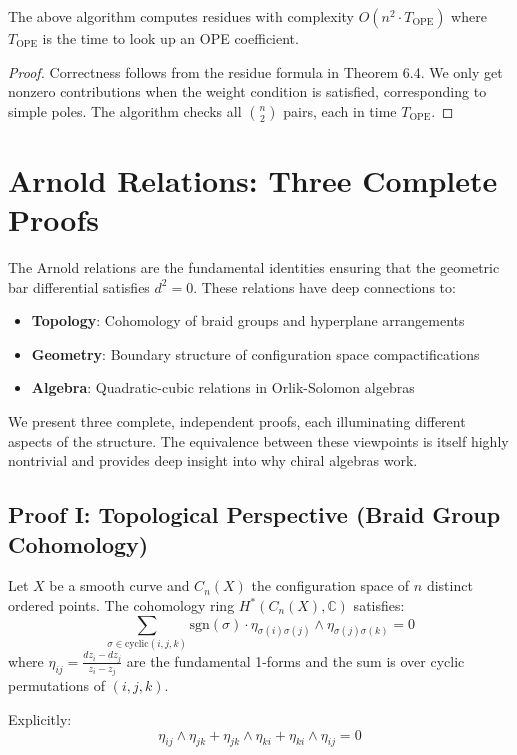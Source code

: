  
\begin{proposition}
The above algorithm computes residues with complexity $O(n^2 \cdot T_{\text{OPE}})$ where $T_{\text{OPE}}$ is the time to look up an OPE coefficient.
\end{proposition}
 
\begin{proof}
Correctness follows from the residue formula in Theorem 6.4. We only get nonzero contributions when the weight condition is satisfied, corresponding to simple poles. The algorithm checks all $\binom{n}{2}$ pairs, each in time $T_{\text{OPE}}$.
\end{proof}

\section{Arnold Relations: Three Complete Proofs}
\label{sec:arnold-three-proofs-comprehensive}

The Arnold relations are the fundamental identities ensuring that the geometric bar 
differential satisfies $d^2 = 0$. These relations have deep connections to:
\begin{itemize}
\item \textbf{Topology}: Cohomology of braid groups and hyperplane arrangements
\item \textbf{Geometry}: Boundary structure of configuration space compactifications
\item \textbf{Algebra}: Quadratic-cubic relations in Orlik-Solomon algebras
\end{itemize}

We present three complete, independent proofs, each illuminating different aspects of 
the structure. The equivalence between these viewpoints is itself highly nontrivial and 
provides deep insight into why chiral algebras work.

\subsection{Proof I: Topological Perspective (Braid Group Cohomology)}
\label{sec:arnold-proof-topological}

\begin{theorem}
\label{thm:arnold-topological}
Let $X$ be a smooth curve and $C_n(X)$ the configuration space of $n$ distinct ordered 
points. The cohomology ring $H^*(C_n(X), \mathbb{C})$ satisfies:
\begin{equation}
\sum_{\sigma \in \text{cyclic}(i,j,k)} \text{sgn}(\sigma) \cdot \eta_{\sigma(i)\sigma(j)} 
\wedge \eta_{\sigma(j)\sigma(k)} = 0
\end{equation}
where $\eta_{ij} = \frac{dz_i - dz_j}{z_i - z_j}$ are the fundamental 1-forms and the 
sum is over cyclic permutations of $(i,j,k)$.

Explicitly:
\begin{equation}
\boxed{\eta_{ij} \wedge \eta_{jk} + \eta_{jk} \wedge \eta_{ki} + \eta_{ki} \wedge 
\eta_{ij} = 0}
\end{equation}
\end{theorem}

